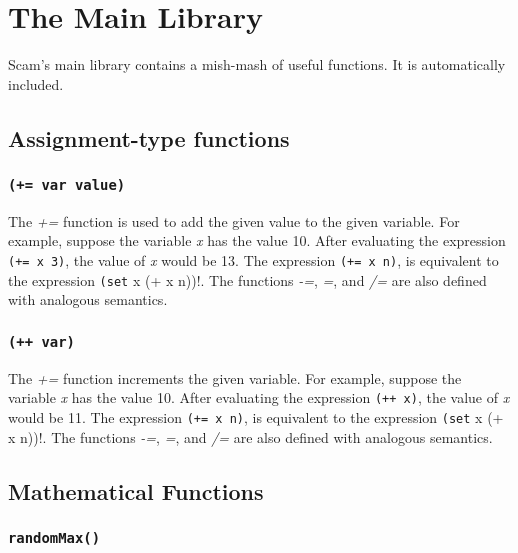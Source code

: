 \chapter{The Main Library}
\label{TheMainLibrary}

Scam's main library contains a mish-mash of useful functions.
It is automatically included.

\section{Assignment-type functions}

\subsection*{{\tt (+= var value)}}

The {\it +=} function is used to add the given value to the
given variable.
For example, suppose the variable {\it x} has the value 10.
After evaluating
the expression \verb!(+= x 3)!,
the value of {\it x} would be 13.
The expression \verb!(+= x n)!,
is equivalent to the expression \verb!(set! x (+ x n))!.
The functions {\it -=}, {\it *=}, and {\it /=} are also defined
with analogous semantics.

\subsection*{{\tt (++ var)}}

The {\it +=} function increments the given variable.
For example, suppose the variable {\it x} has the value 10.
After evaluating
the expression \verb!(++ x)!,
the value of {\it x} would be 11.
The expression \verb!(+= x n)!,
is equivalent to the expression \verb!(set! x (+ x n))!.
The functions {\it -=}, {\it *=}, and {\it /=} are also defined
with analogous semantics.


\section{Mathematical Functions}


\subsection*{{\tt randomMax()}}

